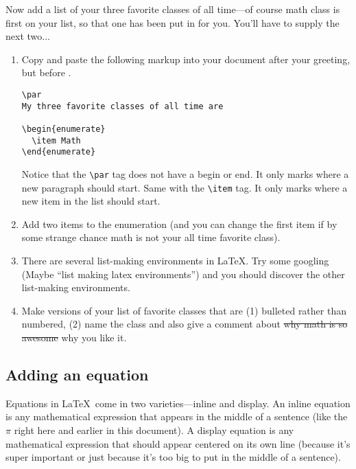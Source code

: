Now add a list of your three favorite classes of all time---of course
math class is first on your list, so that one has been put in for
you. You'll have to supply the next two...

\begin{enumerate}

\item Copy and paste the following markup into your document 
after your greeting, but before \verb++.
\bigskip

\begin{codeblock}
\begin{verbatim}
\par
My three favorite classes of all time are

\begin{enumerate}
  \item Math
\end{enumerate}
\end{verbatim}
\end{codeblock}
\bigskip

Notice that the \verb+\par+ tag does not have a begin
or end. It only marks where a new paragraph should start. Same with
the \verb+\item+ tag. It only marks where a new item
in the list should start.
\item Add two items to the enumeration (and you can change the first item
if by some strange chance math is not your all time favorite class).
\item There are several list-making environments in \LaTeX.  Try some googling (Maybe ``list making latex environments'') 
and you should discover the other list-making environments.
\item Make versions of your list of favorite classes that are (1) bulleted rather than numbered, (2) name the class and also give a comment about \sout{why math is so awesome} why you like it.

\end{enumerate}

\subsection*{Adding an equation}

Equations in \LaTeX\ come in two varieties---inline and display.
An inline equation is any mathematical expression that appears in
the middle of a sentence (like the $\pi$ right here and earlier in
this document). A display equation is any mathematical expression
that should appear centered on its own line (because it's super important
or just because it's too big to put in the middle of a sentence).

